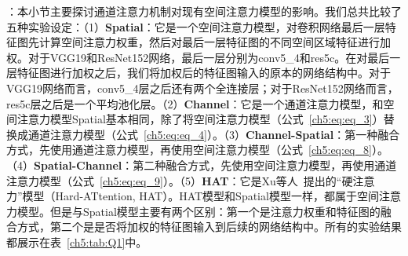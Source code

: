 \textbf{}：本小节主要探讨通道注意力机制对现有空间注意力模型的影响。我们总共比较了五种实验设定：（1）\textbf{Spatial}：它是一个空间注意力模型，对卷积网络最后一层特征图先计算空间注意力权重，然后对最后一层特征图的不同空间区域特征进行加权。对于VGG19和ResNet152网络，最后一层分别为conv5\_4和res5c。在对最后一层特征图进行加权之后，我们将加权后的特征图输入的原本的网络结构中。对于VGG19网络而言，conv5\_4层之后还有两个全连接层；对于ResNet152网络而言，res5c层之后是一个平均池化层。（2）\textbf{Channel}：它是一个通道注意力模型，和空间注意力模型Spatial基本相同，除了将空间注意力模型（公式~\eqref{ch5:eq:eq_3}）替换成通道注意力模型（公式~\eqref{ch5:eq:eq_4}）。（3）\textbf{Channel-Spatial}：第一种融合方式，先使用通道注意力模型，再使用空间注意力模型（公式~\eqref{ch5:eq:eq_8}）。（4）\textbf{Spatial-Channel}：第二种融合方式，先使用空间注意力模型，再使用通道注意力模型（公式~\eqref{ch5:eq:eq_9}）。（5）\textbf{HAT}：它是Xu等人~\cite{xu2015show}提出的“硬注意力”模型（Hard-ATtention, HAT）。HAT模型和Spatial模型一样，都属于空间注意力模型。但是与Spatial模型主要有两个区别：第一个是注意力权重和特征图的融合方式，第二个是是否将加权的特征图输入到后续的网络结构中。所有的实验结果都展示在表~\ref{ch5:tab:Q1}中。

